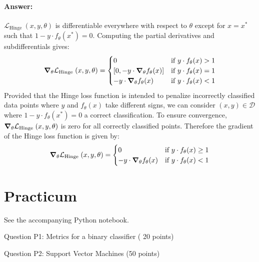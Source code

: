 \documentclass[10pt]{article}
\begin{document}
\paragraph{Answer:} $\mathcal{L}_{\text {Hinge }}(x, y, \theta)$ is differentiable everywhere with respect to $\theta$ except for $x=x^*$ such that $1-y \cdot f_{\theta}(x^*)=0$. Computing the  partial derivatives and subdifferentials gives:
$$\grad_\theta{\mathcal{L}_{\text {Hinge }}(x, y, \theta)}=\begin{cases}
  0 &\text{if } y \cdot f_{\theta}(x) > 1\\
  \left[0, -y\cdot \grad_\theta{f_{\theta}(x)}\right] & \text{if } y \cdot f_{\theta}(x) = 1 \\
  -y\cdot \grad_\theta{f_{\theta}(x)} & \text{if } y \cdot f_{\theta}(x) < 1
\end{cases}$$
Provided that the Hinge loss function is intended to penalize incorrectly classified data points where $y$ and $f_{\theta}(x)$ take different signs, we can consider $(x,y)\in \mathcal{D}$ where $1-y \cdot f_{\theta}(x^*)=0$ a correct classification. To ensure convergence, $\grad_\theta{\mathcal{L}_{\text {Hinge }}(x, y, \theta)}$ is zero for all correctly classified points. Therefore the gradient of the Hinge loss function is given by:
$$\grad_\theta{\mathcal{L}_{\text {Hinge }}(x, y, \theta)}=\begin{cases}
  0 &\text{if } y \cdot f_{\theta}(x) \geq 1\\
  -y\cdot \grad_\theta{f_{\theta}(x)} & \text{if } y \cdot f_{\theta}(x) < 1
\end{cases}$$
\section*{Practicum}
See the accompanying Python notebook.

Question P1: Metrics for a binary classifier ( 20 points)

Question P2: Support Vector Machines (50 points)
\end{document}
